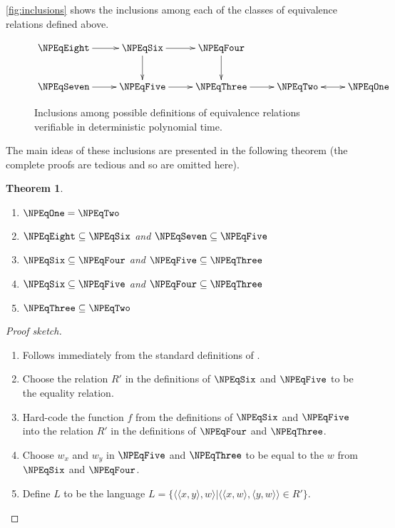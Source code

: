 \documentclass[draft]{article}
\newtheorem{theorem}{Theorem}[section]
\theoremstyle{definition} \newtheorem{openproblem}[openproblem]{Open problem}
\theoremstyle{definition} \newtheorem{definition}[definition]{Definition}
\theoremstyle{remark} \newtheorem{remark}[remark]{Remark}
\newenvironment{sketch}{\begin{proof}[Proof sketch]}{\end{proof}}
\newcommand{\pair}[2]{\langle#1,#2\rangle} %
\begin{document}
\autoref{fig:inclusions} shows the inclusions among each of the classes of equivalence relations defined above.
\begin{figure}
  \caption{\label{fig:inclusions}Inclusions among possible definitions of equivalence relations verifiable in deterministic polynomial time.}
  \begin{displaymath}
    \xymatrix{%
      \NPEqEight \ar[r] & \NPEqSix \ar[d] \ar[r] & \NPEqFour \ar[d] \\
      \NPEqSeven \ar[r] & \NPEqFive \ar[r] & \NPEqThree \ar[r] & \NPEqTwo \ar@{<->}[r] & \NPEqOne }
  \end{displaymath}
\end{figure}
The main ideas of these inclusions are presented in the following theorem (the complete proofs are tedious and so are omitted here).
\begin{theorem}\mbox{}
  \begin{enumerate}
  \item $\NPEqOne=\NPEqTwo$
  \item $\NPEqEight\subseteq\NPEqSix$ and $\NPEqSeven\subseteq\NPEqFive$
  \item $\NPEqSix\subseteq\NPEqFour$ and $\NPEqFive\subseteq\NPEqThree$
  \item $\NPEqSix\subseteq\NPEqFive$ and $\NPEqFour\subseteq\NPEqThree$
  \item $\NPEqThree\subseteq\NPEqTwo$
  \end{enumerate}
\end{theorem}
\begin{sketch}\mbox{}
  \begin{enumerate}
  \item Follows immediately from the standard definitions of \NP.
  \item Choose the relation $R'$ in the definitions of $\NPEqSix$ and $\NPEqFive$ to be the equality relation.
  \item Hard-code the function $f$ from the definitions of $\NPEqSix$ and $\NPEqFive$ into the relation $R'$ in the definitions of $\NPEqFour$ and $\NPEqThree$.
  \item Choose $w_x$ and $w_y$ in $\NPEqFive$ and $\NPEqThree$ to be equal to the $w$ from $\NPEqSix$ and $\NPEqFour$.
  \item Define $L$ to be the language $L=\{\pair{\pair{x}{y}}{w}|\pair{\pair{x}{w}}{\pair{y}{w}}\in R'\}$.\qedhere
  \end{enumerate}
\end{sketch}
\end{document}
